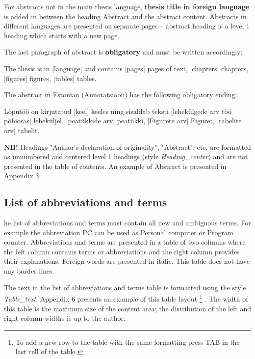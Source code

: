 For abstracts not in the main thesis language, \textbf{thesis title in foreign language} is added in
between the heading Abstract and the abstract content. Abstracts in different languages
are presented on separate pages -- abstract heading is a level 1 heading which starts with
a new page.

The last paragraph of abstract is \textbf{obligatory} and must be written accordingly:

\begin{tcolorbox}[arc=0pt, outer arc=0pt, boxrule=0pt, left=0mm]
The thesis is in [language] and contains [pages] pages of text, [chapters] chapters,
[figures] figures, [tables] tables.
\end{tcolorbox}\vspace{-10pt}

The abstract in Estonian (Annotatsioon) has the following obligatory ending:

\begin{tcolorbox}[arc=0pt, outer arc=0pt, boxrule=0pt, left=0mm]
Lõputöö on kirjutatud [keel] keeles ning sisaldab teksti [lehekülgede arv töö põhiosas]
leheküljel, [peatükkide arv] peatükki, [Figurete arv] Figuret, [tabelite arv] tabelit.
\end{tcolorbox}\vspace{-10pt}

\textbf{NB!} Headings "Author’s declaration of originality", "Abstract", etc. are formatted as
unnumbered and centered level 1 headings (style \textit{Heading\_center}) and are not presented
in the table of contents. An example of Abstract is presented in Appendix 3.

\subsection{List of abbreviations and terms}


he list of abbreviations and terms must contain all new and ambiguous terms. For example the abbreviation PC can be used as Personal computer or Program counter. Abbreviations and terms are presented in a table of two columns where the left column contains terms or abbreviations and the right column provides their explanations. Foreign words are presented in italic. This table does not have any border lines. %

The text in the list of abbreviations and terms table is formatted using the style \textit{Table\_text}.
Appendix 6 presents an example of this table layout \footnote{To add a new row to the table with the same formatting press TAB in the last cell of the table.} . The width of this table is the
maximum size of the content area; the distribution of the left and right column widths is
up to the author.


